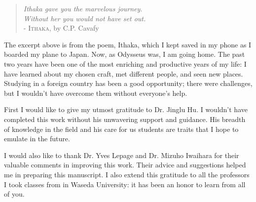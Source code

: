 %
%
%
%
%

\begin{quote}
{\itshape
Ithaka gave you the marvelous journey.\\
Without her you would not have set out.\\
}
- \textsc{Ithaka}, by C.P. Cavafy
\end{quote}

\par The excerpt above is from the poem, Ithaka, which I kept saved in my phone
as I boarded my plane to Japan. Now, as Odysseus was, I am going home.  The
past two years have been one of the most enriching and productive years of my
life: I have learned about my chosen craft, met different people, and seen new
places. Studying in a foreign country has been a good opportunity; there were
challenges, but I wouldn't have overcome them without everyone's help.

\par First I would like to give my utmost gratitude to Dr. Jinglu Hu. I
wouldn't have completed this work without his unwavering support and guidance.
His breadth of knowledge in the field and his care for us students are traits
that I hope to emulate in the future.

\par I would also like to thank Dr. Yves Lepage and Dr. Mizuho Iwaihara for
their valuable comments in improving this work. Their advice and suggestions
helped me in preparing this manuscript. I also extend this gratitude to all the
professors I took classes from in Waseda University: it has been an honor to
learn from all of you.

